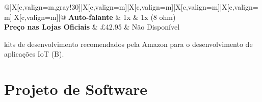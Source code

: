 \begin{table}[htb]
\begin{tblr}{@{}|X[c,valign=m,gray!30]|X[c,valign=m]|X[c,valign=m]|X[c,valign=m]|X[c,valign=m]|X[c,valign=m]|@{}}
		\textbf{Auto-falante}             & 1x                                                                                                                                                                              & 1x (8 ohm)                                                                                                                                                                 \\ \hline
		\textbf{Preço nas Lojas Oficiais} & £42.95                                                                                                                                                                          & Não Disponível                                                                                                                                                             \\ \hline
	\end{tblr}
	\caption{kits de desenvolvimento recomendados pela Amazon para o desenvolvimento de aplicações IoT (B).}
	\label{table_development_kit_b}
\end{table}

\section{Projeto de Software}
